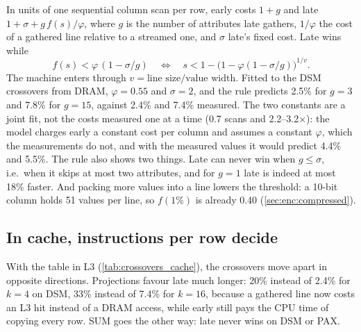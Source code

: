 In units of one sequential column scan per row, early costs $1 + g$ and late
$1 + \sigma + g\,f(s)/\varphi$, where $g$ is the number of attributes late gathers, $1/\varphi$
the cost of a gathered line relative to a streamed one, and $\sigma$ late's fixed cost. Late
wins while
\[
  f(s) < \varphi\,(1-\sigma/g)
  \quad\Longleftrightarrow\quad
  s < 1-\bigl(1-\varphi(1-\sigma/g)\bigr)^{1/v}.
\]
The machine enters through $v = \text{line size}/\text{value width}$. Fitted to the DSM
crossovers from DRAM, $\varphi = 0.55$ and $\sigma = 2$, and the rule predicts 2.5\% for $g=3$
and 7.8\% for $g=15$, against 2.4\% and 7.4\% measured. The two constants are a joint fit, not
the costs measured one at a time (0.7 scans and 2.2--3.2$\times$): the model charges early a
constant cost per column and assumes a constant $\varphi$, which the measurements do not, and
with the measured values it would predict 4.4\% and 5.5\%. The rule also shows two things.
Late can never win when $g \le \sigma$, i.e.\ when it skips at most two attributes, and for
$g=1$ late is indeed at most 18\% faster. And packing more values into a line lowers the
threshold: a 10-bit column holds 51 values per line, so $f(1\%)$ is already 0.40
(\cref{sec:enc:compressed}).

\subsection{In cache, instructions per row decide}
\label{sec:mat:cache}

\begin{table}[t]
\centering
\caption{Selectivity at which late stops beating early with the table in L3 (4\,MB, compare
\cref{tab:crossovers}).}
\label{tab:crossovers_cache}
\end{table}

\begin{table}[t]
\centering\small
\caption{Where late stops beating early on DSM ($k{=}4$), with the scalar and the AVX2
selection vector.}
\label{tab:simdcross}
\end{table}

With the table in L3 (\cref{tab:crossovers_cache}), the crossovers move apart in opposite
directions. Projections favour late much longer: 20\% instead of 2.4\% for $k{=}4$ on DSM, 33\%
instead of 7.4\% for $k{=}16$, because a gathered line now costs an L3 hit instead of a DRAM
access, while early still pays the CPU time of copying every row. SUM goes the other way: late
never wins on DSM or PAX.

